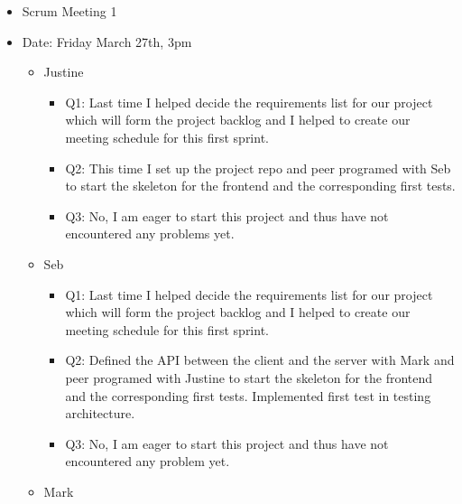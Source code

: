 \documentclass[]{article}
\begin{document}
\begin{itemize}
\itemsep1pt\parskip0pt
\item
  Scrum Meeting 1
\item
  Date: Friday March 27th, 3pm

  \begin{itemize}
  \itemsep1pt\parskip0pt
  \item
    Justine

    \begin{itemize}
    \itemsep1pt\parskip0pt
    \item
      Q1: Last time I helped decide the requirements list for our
      project which will form the project backlog and I helped to create
      our meeting schedule for this first sprint.
    \item
      Q2: This time I set up the project repo and peer programed with
      Seb to start the skeleton for the frontend and the corresponding
      first tests.
    \item
      Q3: No, I am eager to start this project and thus have not
      encountered any problems yet.
    \end{itemize}
  \item
    Seb

    \begin{itemize}
    \itemsep1pt\parskip0pt
    \item
      Q1: Last time I helped decide the requirements list for our
      project which will form the project backlog and I helped to create
      our meeting schedule for this first sprint.
    \item
      Q2: Defined the API between the client and the server with Mark
      and peer programed with Justine to start the skeleton for the
      frontend and the corresponding first tests. Implemented first test
      in testing architecture.
    \item
      Q3: No, I am eager to start this project and thus have not
      encountered any problem yet.
    \end{itemize}
  \item
    Mark


\end{itemize}
\end{itemize}
\end{document}
